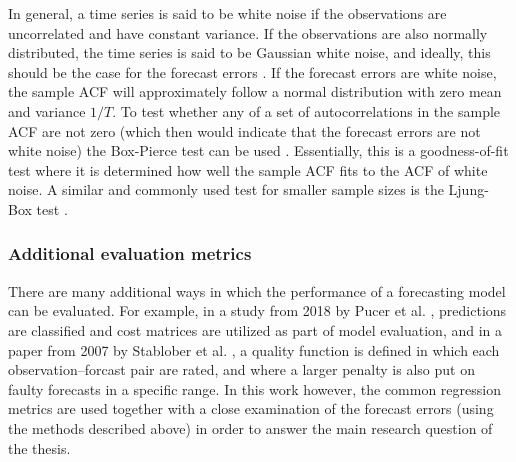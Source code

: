 In general, a time series is said to be white noise if the observations are uncorrelated and have constant variance. If the observations are also normally distributed, the time series is said to be Gaussian white noise, and ideally, this should be the case for the forecast errors \cite{Montgomery2015}. If the forecast errors are white noise, the sample ACF will approximately follow a normal distribution with zero mean and variance $1/T$. To test whether any of a set of autocorrelations in the sample ACF are not zero (which then would indicate that the forecast errors are not white noise) the Box-Pierce test can be used \cite{Montgomery2015}. Essentially, this is a goodness-of-fit test where it is determined how well the sample ACF fits to the ACF of white noise. A similar and commonly used test for smaller sample sizes is the Ljung-Box test \cite{Montgomery2015}.

\subsubsection{Additional evaluation metrics}
There are many additional ways in which the performance of a forecasting model can be evaluated. For example, in a study from 2018 by Pucer et al. \cite{FaganeliPucer2018}, predictions are classified and cost matrices are utilized as part of model evaluation, and in a paper from 2007 by Stablober et al. \cite{Stadlober2008}, a quality function is defined in which each observation--forcast pair are rated, and where a larger penalty is also put on faulty forecasts in a specific range. In this work however, the common regression metrics are used together with a close examination of the forecast errors (using the methods described above) in order to answer the main research question of the thesis.  



%



